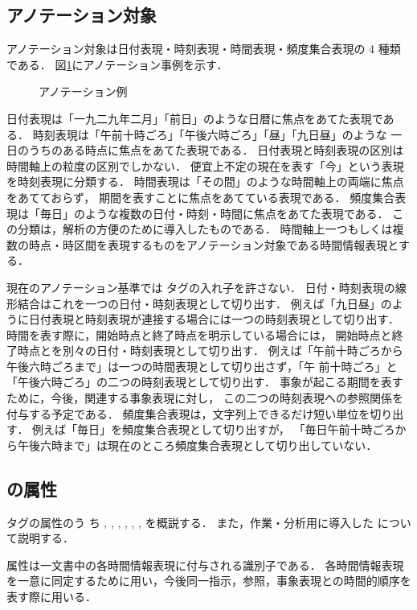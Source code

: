 \documentclass[japanese]{jnlp_1.4}
\def\timexiii{}
\def\tid{}
\def\type{}
\def\value{}
\def\valuefromsurface{}
\def\definite{}
\def\freq{}
\def\quant{}
\def\mod{}
\begin{document}
\subsection{アノテーション対象}

アノテーション対象は日付表現・時刻表現・時間表現・頻度集合表現の 4 種類である．
図\ref{fig:example}にアノテーション事例を示す．

\begin{figure}[b]

\caption{アノテーション例}
\label{fig:example}
\end{figure}

日付表現は「一九二九年二月」「前日」のような日暦に焦点をあてた表現である．
時刻表現は「午前十時ごろ」「午後六時ごろ」「昼」「九日昼」のような
一日のうちのある時点に焦点をあてた表現である．
日付表現と時刻表現の区別は時間軸上の粒度の区別でしかない．
便宜上不定の現在を表す「今」という表現を時刻表現に分類する．
時間表現は「その間」のような時間軸上の両端に焦点をあてておらず，
期間を表すことに焦点をあてている表現である．
頻度集合表現は「毎日」のような複数の日付・時刻・時間に焦点をあてた表現である．
この分類は，解析の方便のために導入したものである．
時間軸上一つもしくは複数の時点・時区間を表現するものをアノテーション対象である時間情報表現とする．

現在のアノテーション基準では \timexiii タグの入れ子を許さない．
日付・時刻表現の線形結合はこれを一つの日付・時刻表現として切り出す．
例えば「九日昼」のように日付表現と時刻表現が連接する場合には一つの時刻表現として切り出す．
時間を表す際に，開始時点と終了時点を明示している場合には，
開始時点と終了時点とを別々の日付・時刻表現として切り出す．
例えば「午前十時ごろから午後六時ごろまで」は一つの時間表現として切り出さず，「午
  前十時ごろ」と「午後六時ごろ」の二つの時刻表現として切り出す．
事象が起こる期間を表すために，今後，関連する事象表現に対し，
この二つの時刻表現への参照関係を付与する予定である．
頻度集合表現は，文字列上できるだけ短い単位を切り出す．
例えば「毎日」を頻度集合表現として切り出すが，
「毎日午前十時ごろから午後六時まで」は現在のところ頻度集合表現として切り出していない．


\subsection{\timexiii の属性}

\timexiii タグの属性のう
ち \tid, \type, \value, \valuefromsurface, \freq, \quant, \mod を概説する．
また，作業・分析用に導入した \definite について説明する．

\tid 属性は一文書中の各時間情報表現に付与される識別子である．
各時間情報表現を一意に同定するために用い，今後同一指示，参照，事象表現との時間的順序を表す際に用いる．
\end{document}
